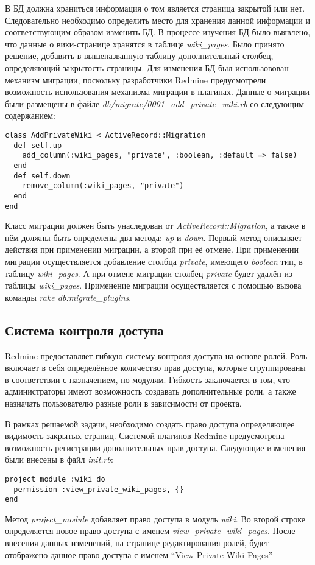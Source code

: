 В БД должна храниться информация о том является страница закрытой или нет.
Следовательно необходимо определить место для хранения данной информации и
соответствующим образом изменить БД. В процессе изучения БД было выявлено, что
данные о вики-странице хранятся в таблице \textit{wiki\_pages}. Было принято
решение, добавить в вышеназванную таблицу дополнительный столбец, определяющий
закрытость страницы. Для изменения БД был использовован механизм миграции,
поскольку разработчики Redmine предусмотрели возможность использования
механизма миграции в плагинах. Данные о миграции были размещены в файле
\textit{db/migrate/0001\_add\_private\_wiki.rb} со следующим содержанием:
\small{\begin{lstlisting}
class AddPrivateWiki < ActiveRecord::Migration
  def self.up
    add_column(:wiki_pages, "private", :boolean, :default => false)
  end
  def self.down
    remove_column(:wiki_pages, "private")
  end
end
\end{lstlisting}}
Класс миграции должен быть унаследован от \textit{ActiveRecord::Migration}, а
также в нём должны быть определены два метода: \textit{up} и \textit{down}.
Первый метод описывает действия при применении миграции, а второй при её
отмене. При применении миграции осуществляется добавление столбца
\textit{private}, имеющего \textit{boolean} тип, в таблицу
\textit{wiki\_pages}. А при отмене миграции столбец \textit{private} будет
удалён из таблицы \textit{wiki\_pages}. Применение миграции осуществляется с
помощью вызова команды \textit{rake db:migrate\_plugins}.

\subsection{Система контроля доступа}
\label{section:access_control}
Redmine предоставляет гибкую систему контроля доступа на основе ролей. Роль
включает в себя определённое количество прав доступа, которые сгруппированы в
соответствии с назначением, по модулям. Гибкость заключается в том, что
администраторы имеют возможность создавать дополнительные роли, а также
назначать пользователю разные роли в зависимости от проекта.

В рамках решаемой задачи, необходимо создать право доступа определяющее
видимость закрытых страниц. Системой плагинов Redmine предусмотрена
возможность регистрации дополнительных прав доступа. Следующие изменения были
внесены в файл \textit{init.rb}:
\small{
\begin{lstlisting}
project_module :wiki do
  permission :view_private_wiki_pages, {}
end
\end{lstlisting}}
Метод \textit{project\_module} добавляет право доступа в модуль \textit{wiki}.
Во второй строке определяется новое право доступа с именем
\textit{view\_private\_wiki\_pages}.
После внесения данных изменений, на странице редактирования ролей, будет
отображено данное право доступа с именем ``View Private Wiki Pages''

